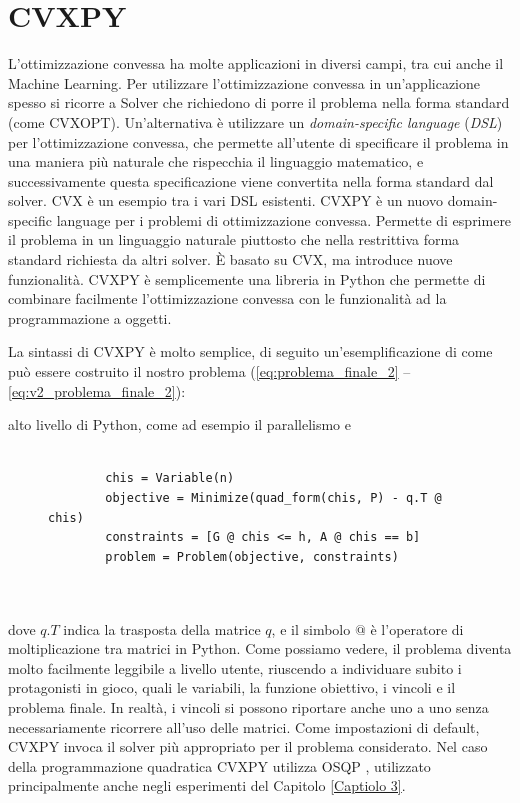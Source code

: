 \documentclass[a4paper,12pt]{report}
\begin{document}
\section{CVXPY}
L'ottimizzazione convessa ha molte applicazioni in diversi campi, tra cui anche il Machine Learning. Per utilizzare l'ottimizzazione convessa in un'applicazione spesso si ricorre a Solver che richiedono di porre il problema nella forma standard (come CVXOPT). Un'alternativa è utilizzare un \textit{domain-specific language} (\textit{DSL}) per l'ottimizzazione convessa, che permette all'utente di specificare il problema in una maniera più naturale che rispecchia il linguaggio matematico, e successivamente questa specificazione viene convertita nella forma standard dal solver. CVX \cite{cvx} è un esempio tra i vari DSL esistenti.
CVXPY \cite{CVXPY_1} \cite{CVXPY_2} è un nuovo domain-specific language per i problemi di ottimizzazione convessa. Permette di esprimere il problema in un linguaggio naturale piuttosto che nella restrittiva forma standard richiesta da altri solver. \`E basato su CVX, ma introduce nuove funzionalità. CVXPY è semplicemente una libreria in Python che permette di combinare facilmente l'ottimizzazione convessa con le funzionalità ad  la programmazione a oggetti.

La sintassi di CVXPY è molto semplice, di seguito un'esemplificazione di come può essere costruito il nostro problema (\ref{eq:problema_finale_2} -- \ref{eq:v2_problema_finale_2}):

alto livello di Python, come ad esempio il parallelismo e\begin{figure}[H]
    \begin{verbatim}

        chis = Variable(n)
        objective = Minimize(quad_form(chis, P) - q.T @ chis)
        constraints = [G @ chis <= h, A @ chis == b]
        problem = Problem(objective, constraints)
        
        
    \end{verbatim}
\end{figure}

\noindent dove $q.T$ indica la trasposta della matrice $q$, e il simbolo $@$ è l'operatore di moltiplicazione tra matrici in Python. Come possiamo vedere, il problema diventa molto facilmente leggibile a livello utente, riuscendo a individuare subito i protagonisti in gioco, quali le variabili, la funzione obiettivo, i vincoli e il problema finale. In realtà, i vincoli si possono riportare anche uno a uno senza necessariamente ricorrere all'uso delle matrici.
Come impostazioni di default, CVXPY invoca il solver più appropriato per il problema considerato. Nel caso della programmazione quadratica CVXPY utilizza OSQP \cite{osqp}, utilizzato principalmente anche negli esperimenti del Capitolo \ref{Captiolo 3}.
\end{document}
